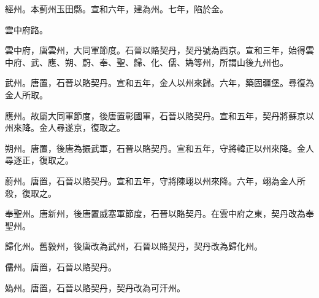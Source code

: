 \begin{pinyinscope}
 經州。本薊州玉田縣。宣和六年，建為州。七年，陷於金。



 雲中府路。



 雲中府，唐雲州，大同軍節度。石晉以賂契丹，契丹號為西京。宣和三年，始得雲中府、武、應、朔、蔚、奉、聖、歸、化、儒、媯等州，所謂山後九州也。



 武州。唐置，石晉以賂契丹。宣和五年，金人以州來歸。六年，築固疆堡。尋復為金人所取。



 應州。故屬大同軍節度，後唐置彰國軍，石晉以賂契丹。宣和五年，契丹將蘇京以州來降。金人尋遂京，復取之。



 朔州。唐置，後唐為振武軍，石晉以賂契丹。宣和五年，守將韓正以州來降。金人尋逐正，復取之。



 蔚州。唐置，石晉以賂契丹。宣和五年，守將陳翊以州來降。六年，翊為金人所殺，復取之。



 奉聖州。唐新州，後唐置威塞軍節度，石晉以賂契丹。在雲中府之東，契丹改為奉聖州。



 歸化州。舊毅州，後唐改為武州，石晉以賂契丹，契丹改為歸化州。



 儒州。唐置，石晉以賂契丹。



 媯州。唐置，石晉以賂契丹，契丹改為可汗州。



\end{pinyinscope}